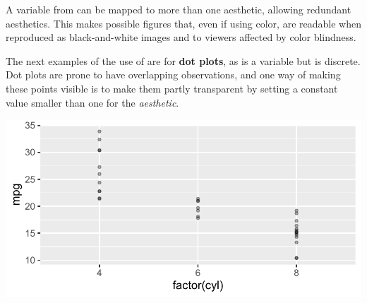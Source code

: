 \documentclass[krantz2]{krantz}\usepackage{knitr}
\begin{document}
A variable from  can be mapped to more than one aesthetic, allowing redundant aesthetics. This makes possible figures that, even if using color, are readable when reproduced as black-and-white images and to viewers affected by color blindness.

\begin{knitrout}\footnotesize
{}\color{fgcolor}\begin{kframe}
\begin{alltt}
\hlstd{(} 
        \hlstd{=} \hlstd{(}   
        \hlstd{=}   \hlstd{=}  \hlopt{+}
  \hlstd{()}
\end{alltt}
\end{kframe}
\end{knitrout}

The next examples of the use of  are for \textbf{dot plots}, as  is a  variable but  is discrete. Dot plots are prone to have overlapping observations, and one way of making these points visible is to make them partly transparent by setting a constant value smaller than one for the  \emph{aesthetic}.

\begin{knitrout}\footnotesize
{}\color{fgcolor}\begin{kframe}
\begin{alltt}
\hlstd{(} 
        \hlstd{=} \hlstd{(} \hlstd{=}    \hlopt{+}
  \hlstd{(} \hlstd{=} \hlopt{/}\hlstd{)}
\end{alltt}
\end{kframe}

{\centering \includegraphics[width=.7\textwidth]{figure/pos-scatter-12a-1} 

}


\end{knitrout}
\end{document}
